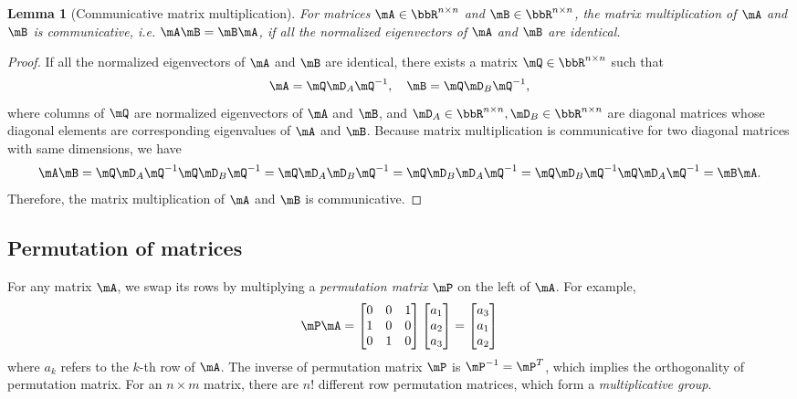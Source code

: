 \documentclass[11pt]{article}
\theoremstyle{plain}
\newtheorem{lem}{Lemma}
\theoremstyle{definition}
\begin{document}
\begin{lem}[Communicative matrix multiplication]\label{lem:matrixcomm} For matrices $\mA \in \bbR^{n \times n}$ and $\mB \in \bbR^{n \times n}$, the matrix multiplication of $\mA$ and $\mB$ is communicative, i.e. $\mA\mB  = \mB \mA$, if all the normalized eigenvectors of $\mA$ and $\mB$ are identical.	
\end{lem}

\begin{proof}
	If all the normalized eigenvectors of $\mA$ and $\mB$ are identical, there exists a matrix $\mQ \in \bbR^{n \times n}$ such that
	\[ \mA = \mQ \mD_A \mQ^{-1}, \quad \mB = \mQ \mD_B \mQ^{-1},\]
	where columns of $\mQ$ are normalized eigenvectors of $\mA$ and $\mB$, and $\mD_A\in\bbR^{n \times n},  \mD_B\in\bbR^{n \times n} $ are diagonal matrices whose diagonal elements are corresponding eigenvalues of $\mA$ and $\mB$. Because matrix multiplication is communicative for two diagonal matrices with same dimensions, we have
	\[  \mA \mB = \mQ \mD_A \mQ^{-1} \mQ \mD_B \mQ^{-1} = \mQ \mD_A \mD_B \mQ^{-1}  =\mQ \mD_B \mD_A \mQ^{-1} = \mQ \mD_B \mQ^{-1} \mQ \mD_A \mQ^{-1}  = \mB \mA .\]
	Therefore, the matrix multiplication of $\mA$ and $\mB$ is communicative.
\end{proof}

\subsection{Permutation of matrices}
For any matrix $\mA$, we swap its rows by multiplying a \textit{permutation matrix } $\mP$ on the left of $\mA$. For example,
\begin{align}
	\mP \mA = \begin{bmatrix}
		0 &0&1\\1 & 0 & 0\\ 0 & 1 & 0 
	\end{bmatrix}  \begin{bmatrix}
		a_1\\a_2\\ a_3
	\end{bmatrix}  = \begin{bmatrix}
		a_3\\a_1\\ a_2
	\end{bmatrix}
\end{align}
where $a_k$ refers to the $k$-th row of $\mA$. The inverse of permutation matrix $\mP$ is $\mP^{-1} = \mP^T$, which implies the orthogonality of permutation matrix. For an $n \times m$ matrix, there are $n!$ different row permutation matrices, which form a \textit{multiplicative group}.
\end{document}
